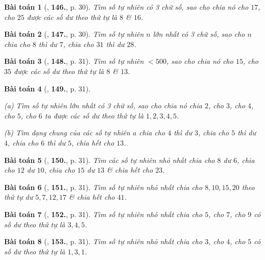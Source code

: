 \documentclass{article}
\numberwithin{equation}{section}
\newtheorem{baitoan}{Bài toán}[section]
\begin{document}
\begin{baitoan}[\cite{Binh_Toan_6_tap_1}, \textbf{146.}, p. 30]
	Tìm số tự nhiên có 3 chữ số, sao cho chia nó cho $17$, cho $25$ được các số dư theo thứ tự là $8$ \& $16$.
\end{baitoan}

\begin{baitoan}[\cite{Binh_Toan_6_tap_1}, \textbf{147.}, p. 30]
	Tìm số tự nhiên $n$ lớn nhất có 3 chữ số, sao cho $n$ chia cho $8$ thì dư $7$, chia cho $31$ thì dư $28$.
\end{baitoan}

\begin{baitoan}[\cite{Binh_Toan_6_tap_1}, \textbf{148.}, p. 31]
	Tìm số tự nhiên $< 500$, sao cho chia nó cho $15$, cho $35$ được các số dư theo thứ tự là $8$ \& $13$.
\end{baitoan}

\begin{baitoan}[\cite{Binh_Toan_6_tap_1}, \textbf{149.}, p. 31]
	\begin{enumerate*}
		\item[(a)] Tìm số tự nhiên lớn nhất có 3 chữ số, sao cho chia nó chia $2$, cho $3$, cho $4$, cho $5$, cho $6$ ta được các số dư theo thứ tự là $1,2,3,4,5$.
		\item[(b)] Tìm dạng chung của các số tự nhiên $a$ chia cho $4$ thì dư $3$, chia cho $5$ thì dư $4$, chia cho $6$ thì dư $5$, chia hết cho $13$.
	\end{enumerate*}
\end{baitoan}

\begin{baitoan}[\cite{Binh_Toan_6_tap_1}, \textbf{150.}, p. 31]
	Tìm các số tự nhiên nhỏ nhất chia cho $8$ dư $6$, chia cho $12$ dư $10$, chia cho $15$ dư $13$ \& chia hết cho $23$.
\end{baitoan}

\begin{baitoan}[\cite{Binh_Toan_6_tap_1}, \textbf{151.}, p. 31]
	Tìm số tự nhiên nhỏ nhất chia cho $8,10,15,20$ theo thứ tự dư $5,7,12,17$ \& chia hết cho $41$.
\end{baitoan}

\begin{baitoan}[\cite{Binh_Toan_6_tap_1}, \textbf{152.}, p. 31]
	Tìm số tự nhiên nhỏ nhất chia cho $5$, cho $7$, cho $9$ có số dư theo thứ tự là $3,4,5$.
\end{baitoan}

\begin{baitoan}[\cite{Binh_Toan_6_tap_1}, \textbf{153.}, p. 31]
	Tìm số tự nhiên nhỏ nhất chia cho $3$, cho $4$, cho $5$ có số dư theo thứ tự là $1,3,1$.
\end{baitoan}
\end{document}
